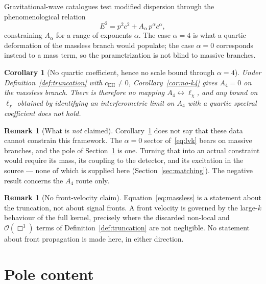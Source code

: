 \documentclass[12pt,a4paper]{article}
\newtheorem{corollary}[theorem]{Corollary}
\theoremstyle{definition}
\newtheorem{remark}[theorem]{Remark}
\newcommand{\cEH}{c_{\mathrm{EH}}}
\begin{document}
    Gravitational-wave catalogues test modified dispersion through the phenomenological
    relation~\cite{LIGO2019Dispersion}
    \begin{equation}
      E^2 = p^2c^2 + A_\alpha\,p^\alpha c^\alpha ,
      \label{eq:lvk}
    \end{equation}
    constraining $A_\alpha$ for a range of exponents $\alpha$. The case $\alpha = 4$ is what a quartic deformation
    of the massless branch would populate; the case $\alpha = 0$ corresponds instead to a mass term, so the
    parametrization is not blind to massive branches.

    \begin{corollary}[No quartic coefficient, hence no scale bound through $\alpha=4$]
      \label{cor:no-bound}
      Under Definition~\ref{def:truncation} with $\cEH \neq 0$, Corollary~\ref{cor:no-k4} gives $A_4 = 0$ on the
      massless branch. There is therefore no mapping $A_4 \leftrightarrow \ell_\chi$, and any bound on $\ell_\chi$
      obtained by identifying an interferometric limit on $A_4$ with a quartic spectral coefficient does not hold.
    \end{corollary}

    \begin{remark}[What is \emph{not} claimed]
      \label{rem:not-claimed}
      Corollary~\ref{cor:no-bound} does not say that these data cannot constrain this framework. The
      $\alpha = 0$ sector of~\eqref{eq:lvk} bears on massive branches, and the pole of Section~\ref{sec:poles} is
      one. Turning that into an actual constraint would require its mass, its coupling to the detector, and its
      excitation in the source --- none of which is supplied here (Section~\ref{sec:matching}). The negative
      result concerns the $A_4$ route only.
    \end{remark}

    \begin{remark}[No front-velocity claim]
      \label{rem:front}
      Equation~\eqref{eq:massless} is a statement about the truncation, not about signal fronts. A front velocity
      is governed by the large-$k$ behaviour of the full kernel, precisely where the discarded non-local and
      $\mathcal{O}(\Box^3)$ terms of Definition~\ref{def:truncation} are not negligible. No statement about front
      propagation is made here, in either direction.
    \end{remark}

  \section{Pole content}
    \label{sec:poles}
\end{document}
